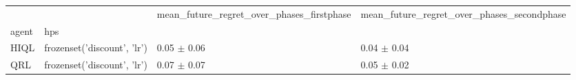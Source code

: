 \begin{tabular}{llll}
\toprule
 &  & mean_future_regret_over_phases_firstphase & mean_future_regret_over_phases_secondphase \\
agent & hps &  &  \\
\midrule
HIQL & frozenset({'discount', 'lr'}) & 0.05 $\pm$ 0.06 & 0.04 $\pm$ 0.04 \\
\cline{1-4}
QRL & frozenset({'discount', 'lr'}) & 0.07 $\pm$ 0.07 & 0.05 $\pm$ 0.02 \\
\cline{1-4}
\bottomrule
\end{tabular}
